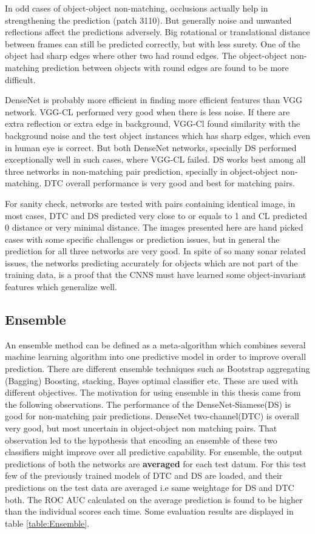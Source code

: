 In odd cases of object-object non-matching, occlusions actually help in strengthening the prediction (patch 3110). But generally noise and unwanted reflections affect the predictions adversely. 
Big rotational or translational distance between frames can still be predicted correctly, but with less surety.
One of the object had sharp edges where other two had round edges. The object-object non-matching prediction between objects with round edges are found to be more difficult.

DenseNet is probably more efficient in finding more efficient features than VGG network. VGG-CL performed very good when there is less noise. If there are extra reflection or extra edge in background, VGG-Cl found similarity
 with the background noise and the test object instances which has sharp edges, which even in human eye is correct. But both DenseNet networks, specially DS performed exceptionally well in such cases, where VGG-CL failed.
DS works best among all three networks in non-matching pair prediction, specially in object-object non-matching. DTC overall performance is very good and best for matching pairs.

For sanity check, networks are tested with pairs containing identical image, in most cases, DTC and DS predicted very close to or equals to 1 and CL predicted 0 distance or very minimal distance. 
The images presented here are hand picked cases with some specific challenges or prediction issues, but in general the prediction for all three networks are very good. In spite of so many sonar related issues, the networks 
 predicting accurately for objects which are not part of the training data, is a proof that the CNNS must have learned some object-invariant features which generalize well. 

\subsection{Ensemble}
An ensemble method can be defined as a meta-algorithm which combines several machine learning algorithm into one predictive model in order to improve overall prediction. There are different ensemble techniques such as 
Bootstrap aggregating (Bagging) Boosting, stacking, Bayes optimal classifier etc. These are used with different objectives. The motivation for using ensemble in this thesis came from the 
following observations.
The performance of the DenseNet-Siamese(DS) is good for non-matching pair predictions. DenseNet two-channel(DTC) is overall very good, but most uncertain in object-object non matching pairs.
That observation led to the hypothesis that encoding an ensemble of these two classifiers might improve over all predictive capability. 
For ensemble, the output predictions of both the networks are \textbf{averaged} for each test datum. For this test few of the previously 
trained models of DTC and DS are loaded, and their predictions on the test data are averaged i.e same weightage for DS and DTC both. The ROC AUC calculated on the average prediction is found to be higher than the individual scores each time.
Some evaluation results are displayed in table \ref{table:Ensemble}. %

